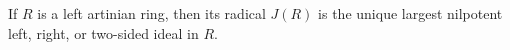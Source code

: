 If $R$ is a left artinian ring, then its radical $J(R)$ is the unique largest nilpotent left, right, or two-sided ideal in $R$.
